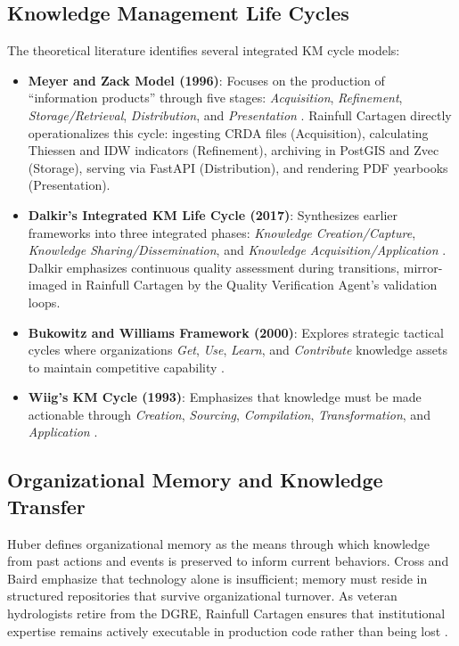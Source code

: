 \documentclass[12pt,a4paper]{report}
\begin{document}
\subsection{Knowledge Management Life Cycles}
The theoretical literature identifies several integrated KM cycle models:
\begin{itemize}
  \item \textbf{Meyer and Zack Model (1996)}: Focuses on the production of ``information products'' through five stages: \textit{Acquisition}, \textit{Refinement}, \textit{Storage/Retrieval}, \textit{Distribution}, and \textit{Presentation} \cite{meyer1996}. Rainfull Cartagen directly operationalizes this cycle: ingesting CRDA files (Acquisition), calculating Thiessen and IDW indicators (Refinement), archiving in PostGIS and Zvec (Storage), serving via FastAPI (Distribution), and rendering PDF yearbooks (Presentation).
  \item \textbf{Dalkir's Integrated KM Life Cycle (2017)}: Synthesizes earlier frameworks into three integrated phases: \textit{Knowledge Creation/Capture}, \textit{Knowledge Sharing/Dissemination}, and \textit{Knowledge Acquisition/Application} \cite{dalkir2017}. Dalkir emphasizes continuous quality assessment during transitions, mirror-imaged in Rainfull Cartagen by the Quality Verification Agent's validation loops.
  \item \textbf{Bukowitz and Williams Framework (2000)}: Explores strategic tactical cycles where organizations \textit{Get}, \textit{Use}, \textit{Learn}, and \textit{Contribute} knowledge assets to maintain competitive capability \cite{bukowitz2000}.
  \item \textbf{Wiig's KM Cycle (1993)}: Emphasizes that knowledge must be made actionable through \textit{Creation}, \textit{Sourcing}, \textit{Compilation}, \textit{Transformation}, and \textit{Application} \cite{wiig1993}.
\end{itemize}

\subsection{Organizational Memory and Knowledge Transfer}
Huber \cite{huber1991} defines organizational memory as the means through which knowledge from past actions and events is preserved to inform current behaviors. Cross and Baird \cite{cross2000} emphasize that technology alone is insufficient; memory must reside in structured repositories that survive organizational turnover. As veteran hydrologists retire from the DGRE, Rainfull Cartagen ensures that institutional expertise remains actively executable in production code rather than being lost \cite{argote2000}.
\end{document}
